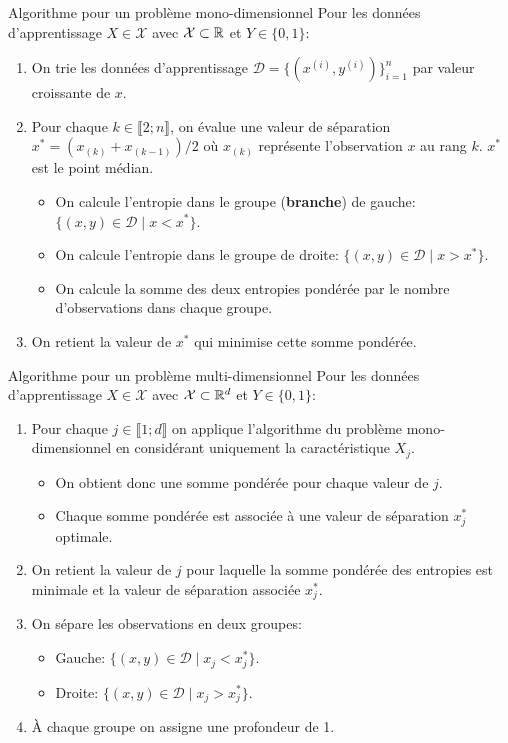 \begin{frame}{Algorithme pour un problème mono-dimensionnel}
	Pour les données d'apprentissage $X \in \mathcal{X}$ avec $\mathcal{X} \subset \mathbb{R}$ et $Y \in\{0, 1\}$:
	\begin{enumerate}
		\item On trie les données d'apprentissage $\mathcal{D} = \{(x^{(i)}, y^{(i)})\}_{i=1}^n$ par valeur croissante de $x$.
		\pause
		\item Pour chaque $k \in \llbracket 2; n \rrbracket$, on évalue une valeur de séparation $x^* = \left(x_{(k)} + x_{(k - 1)}\right) / 2$ où $x_{(k)}$ représente l'observation $x$ au rang $k$. $x^*$ est le point médian.
		\begin{itemize}
			\item On calcule l'entropie dans le groupe (\textbf{branche}) de gauche: $\{(x, y) \in \mathcal{D} \mid x < x^*\}$.
			\item On calcule l'entropie dans le groupe de droite: $\{(x, y) \in \mathcal{D} \mid x > x^*\}$.
			\item On calcule la somme des deux entropies pondérée par le nombre d'observations dans chaque groupe.
		\end{itemize}
		\pause
		\item On retient la valeur de $x^*$ qui minimise cette somme pondérée.
	\end{enumerate}
\end{frame}

\begin{frame}{Algorithme pour un problème multi-dimensionnel}
	Pour les données d'apprentissage $X \in \mathcal{X}$ avec $\mathcal{X} \subset \mathbb{R}^d$ et $Y \in\{0, 1\}$:
	\begin{enumerate}
		\item Pour chaque $j \in \llbracket 1; d \rrbracket$ on applique l'algorithme du problème mono-dimensionnel en considérant uniquement la caractéristique $X_j$.
		\begin{itemize}
			\item On obtient donc une somme pondérée pour chaque valeur de $j$.
			\item Chaque somme pondérée est associée à une valeur de séparation $x_j^*$ optimale.
		\end{itemize}
		\pause
		\item On retient la valeur de $j$ pour laquelle la somme pondérée des entropies est minimale et la valeur de séparation associée $x_j^*$.
		\pause
		\item On sépare les observations en deux groupes:
		\begin{itemize}
			\item Gauche: $\{(x, y) \in \mathcal{D} \mid x_j < x_j^*\}$.
			\item Droite: $\{(x, y) \in \mathcal{D} \mid x_j > x_j^*\}$.
		\end{itemize}
		\pause
		\item \`A chaque groupe on assigne une profondeur de 1.
	\end{enumerate}
\end{frame}

